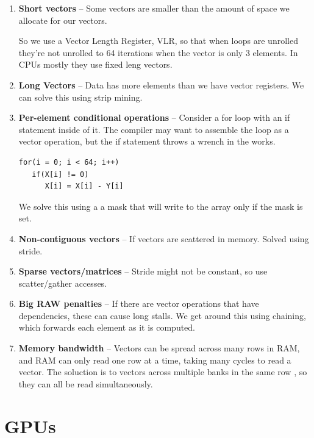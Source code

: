 \documentclass{article}
\begin{document}
\begin{enumerate}
\item \textbf{Short vectors} -- Some vectors are smaller than the amount of space we allocate for our vectors. 

So we use a Vector Length Register, VLR, so that when loops are unrolled they're not unrolled to 64 iterations when the vector is only 3 elements. In CPUs mostly they use fixed leng vectors. 

\item \textbf{Long Vectors} -- Data has more elements than we have vector registers. We can solve this using strip mining. 

\item \textbf{Per-element conditional operations} -- Consider a for loop with an if statement inside of it. The compiler may want to assemble the loop as a vector operation, but the if statement throws a wrench in the works. 

\scriptsize
\begin{verbatim}
for(i = 0; i < 64; i++)
   if(X[i] != 0) 
      X[i] = X[i] - Y[i] 
\end{verbatim}
\normalsize 

We solve this using a a mask that will write to the array only if the mask is set. 

\item \textbf{Non-contiguous vectors} -- If vectors are scattered in memory. Solved using stride. 

\item \textbf{Sparse vectors/matrices} -- Stride might not be constant, so use scatter/gather accesses. 

\item \textbf{Big RAW penalties} -- If there are vector operations that have dependencies, these can cause long stalls. We get around this using chaining, which forwards each element as it is computed. 

\item \textbf{Memory bandwidth} -- Vectors can be spread across many rows in RAM, and RAM can only read one row at a time, taking many cycles to read a vector. The soluction is to  vectors across multiple banks in the same row , so they can all be read simultaneously. 
\end{enumerate}

\section{GPUs}
\end{document}

